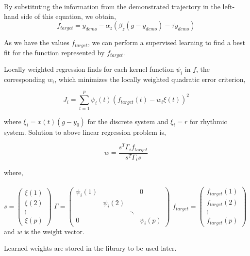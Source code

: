 By substituting the information from the demonstrated trajectory in the left-hand side of this equation, we obtain,
\begin{equation}
f_{target} = \ddot{y}_{demo} - \alpha_{z}(\beta_{z}(g - y_{demo}) - \tau\dot{y}_{demo})
\end{equation}


As we have the values $f_{target}$, we can perform a supervised learning to find a best fit for the function represented by $f_{target}$. 

Locally weighted regression finds for each kernel function $\psi_{i}$ in $f$, the
corresponding $w_{i}$, which minimizes the locally weighted quadratic error criterion,

\begin{equation}
J_{i} = \sum_{t=1}^{p}\psi_{i}(t)(f_{target}(t)-w_{i}\xi(t))^{2}
\end{equation}

where $\xi_{i} = x(t)(g-y_{0})$ for the discrete system and $\xi_{i} = r$ for rhythmic system. Solution to above linear regression problem is,

\begin{equation}
w = \frac{s^{T}\Gamma_{i}f_{target}}{s^{T}\Gamma_{i}s}
\end{equation}

where,\\
\\
\vspace{1cm}
$
s = 
\begin{pmatrix}
\xi(1) \\
\xi(2) \\
\vdots  \\
\xi(p) 
\end{pmatrix}
$
$
\Gamma = 
\begin{pmatrix}
\psi_{i}(1) &   &  & 0 \\
&\psi_{i}(2)&  &  \\
&  & \ddots &   \\
0 &  &  & \psi_{i}(p)
\end{pmatrix}
$
$
f_{target} = 
\begin{pmatrix}
f_{target}(1) \\
f_{target}(2) \\
\vdots  \\
f_{target}(p) 
\end{pmatrix}
$
\\
and $w$ is the weight vector.  

Learned weights are stored in the library to be used later.



